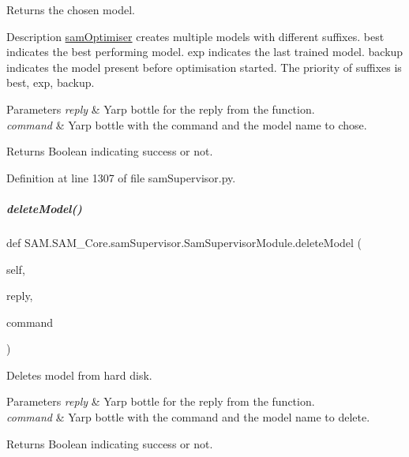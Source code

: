 Returns the chosen model. 

\begin{DoxyParagraph}{Description}
\hyperlink{namespaceSAM_1_1SAM__Core_1_1samOptimiser}{sam\+Optimiser} creates multiple models with different suffixes. {\ttfamily best} indicates the best performing model. {\ttfamily exp} indicates the last trained model. {\ttfamily backup} indicates the model present before optimisation started. The priority of suffixes is {\ttfamily best}, {\ttfamily exp}, {\ttfamily backup}.
\end{DoxyParagraph}

\begin{DoxyParams}{Parameters}
{\em reply} & Yarp bottle for the reply from the function. \\
\hline
{\em command} & Yarp bottle with the command and the model name to chose.\\
\hline
\end{DoxyParams}
\begin{DoxyParagraph}{Returns}
Boolean indicating success or not. 
\end{DoxyParagraph}


Definition at line 1307 of file sam\+Supervisor.\+py.

\mbox{\label{group__icubclient__SAM__Core_a01051c2ab9e4f136dd85dfe420974c6e}} 
\subparagraph{\texorpdfstring{delete\+Model()}{deleteModel()}}
{\footnotesize\ttfamily def S\+A\+M.\+S\+A\+M\+\_\+\+Core.\+sam\+Supervisor.\+Sam\+Supervisor\+Module.\+delete\+Model (\begin{DoxyParamCaption}\item[{}]{self,  }\item[{}]{reply,  }\item[{}]{command }\end{DoxyParamCaption})}



Deletes model from hard disk. 


\begin{DoxyParams}{Parameters}
{\em reply} & Yarp bottle for the reply from the function. \\
\hline
{\em command} & Yarp bottle with the command and the model name to delete.\\
\hline
\end{DoxyParams}
\begin{DoxyParagraph}{Returns}
Boolean indicating success or not. 
\end{DoxyParagraph}


